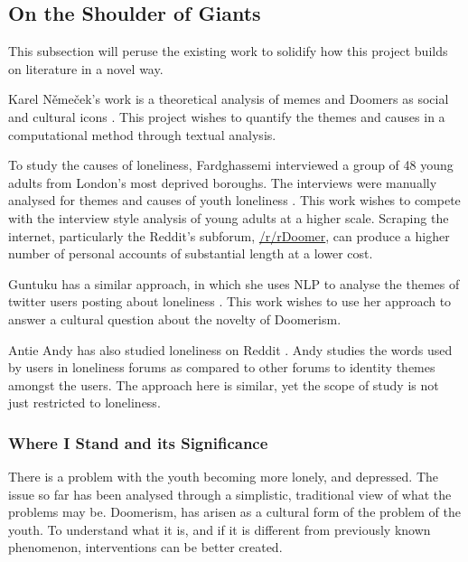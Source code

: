 \documentclass[../report.tex]{subfiles}
\begin{document}
\subsection{On the Shoulder of Giants}
This subsection will peruse the existing work to solidify how this project builds on literature in a novel way. 

Karel Němeček's work is a theoretical analysis of memes and Doomers as social and cultural icons \cite{memes_reservoir}.
This project wishes to quantify the themes and causes in a computational method through textual analysis.

To study the causes of loneliness, Fardghassemi interviewed a group of 48 young adults from London's most deprived boroughs. The interviews were manually analysed for themes and causes of youth loneliness \cite{fardghassemi_interviews}.
This work wishes to compete with the interview style analysis of young adults at a higher scale.
Scraping the internet, particularly the Reddit's subforum,
\href{www.reddit.com/r/Doomer}{/r/rDoomer},
can produce a higher number of personal accounts of substantial length at a lower cost.

Guntuku has a similar approach, in which she uses NLP to analyse the themes of twitter users posting about loneliness \cite{twitter_loneliness}.
This work wishes to use her approach to answer a cultural question about the novelty of Doomerism.

Antie Andy has also studied loneliness on Reddit \cite{andy_2021}.
Andy studies the words used by users in loneliness forums as compared to other forums to identity themes amongst the users.
The approach here is similar, yet the scope of study is not just restricted to loneliness. 

\subsubsection{Where I Stand and its Significance}
There is a problem with the youth becoming more lonely, and depressed. 
The issue so far has been analysed through a simplistic, traditional view of what the problems may be.
Doomerism, has arisen as a cultural form of the problem of the youth. 
To understand what it is, and if it is different from previously known phenomenon, interventions can be better created. 
\end{document}
